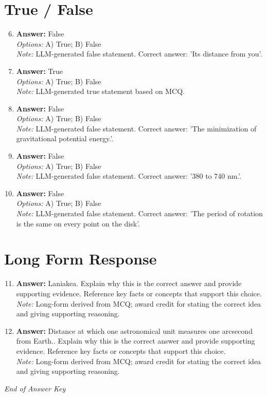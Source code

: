 \documentclass[12pt]{article}
\begin{document}
\section*{True / False}
\begin{enumerate}[label=\arabic*.]
\setcounter{enumi}{5}
\item \textbf{Answer:} False
\\ \textit{Options:} A) True; B) False
\\ \textit{Note:} LLM-generated false statement. Correct answer: 'Its distance from you'.
\item \textbf{Answer:} True
\\ \textit{Options:} A) True; B) False
\\ \textit{Note:} LLM-generated true statement based on MCQ.
\item \textbf{Answer:} False
\\ \textit{Options:} A) True; B) False
\\ \textit{Note:} LLM-generated false statement. Correct answer: 'The minimization of gravitational potential energy.'.
\item \textbf{Answer:} False
\\ \textit{Options:} A) True; B) False
\\ \textit{Note:} LLM-generated false statement. Correct answer: '380 to 740 nm.'.
\item \textbf{Answer:} False
\\ \textit{Options:} A) True; B) False
\\ \textit{Note:} LLM-generated false statement. Correct answer: 'The period of rotation is the same on every point on the disk'.
\end{enumerate}

\section*{Long Form Response}
\begin{enumerate}[label=\arabic*.]
\setcounter{enumi}{10}
\item \textbf{Answer:} Laniakea. Explain why this is the correct answer and provide supporting evidence. Reference key facts or concepts that support this choice.
\\ \textit{Note:} Long-form derived from MCQ; award credit for stating the correct idea and giving supporting reasoning.
\item \textbf{Answer:} Distance at which one astronomical unit measures one arcsecond from Earth.. Explain why this is the correct answer and provide supporting evidence. Reference key facts or concepts that support this choice.
\\ \textit{Note:} Long-form derived from MCQ; award credit for stating the correct idea and giving supporting reasoning.
\end{enumerate}

\vfill
\noindent\textit{End of Answer Key}
\end{document}
